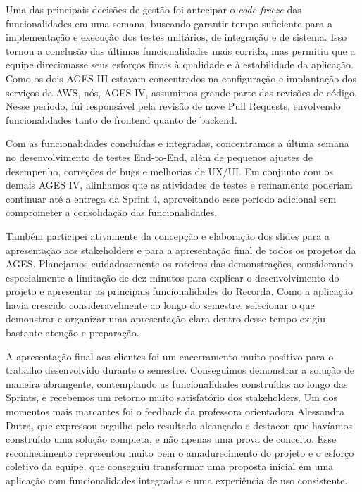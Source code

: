 \indent Uma das principais decisões de gestão foi antecipar o \textit{code freeze} das funcionalidades em uma semana, buscando garantir tempo suficiente para a implementação e execução dos testes unitários, de integração e de sistema. Isso tornou a conclusão das últimas funcionalidades mais corrida, mas permitiu que a equipe direcionasse seus esforços finais à qualidade e à estabilidade da aplicação. Como os dois AGES III estavam concentrados na configuração e implantação dos serviços da AWS, nós, AGES IV, assumimos grande parte das revisões de código. Nesse período, fui responsável pela revisão de nove Pull Requests, envolvendo funcionalidades tanto de frontend quanto de backend.\par

\indent Com as funcionalidades concluídas e integradas, concentramos a última semana no desenvolvimento de testes End-to-End, além de pequenos ajustes de desempenho, correções de bugs e melhorias de UX/UI. Em conjunto com os demais AGES IV, alinhamos que as atividades de testes e refinamento poderiam continuar até a entrega da Sprint 4, aproveitando esse período adicional sem comprometer a consolidação das funcionalidades.\par

\indent Também participei ativamente da concepção e elaboração dos slides para a apresentação aos stakeholders e para a apresentação final de todos os projetos da AGES. Planejamos cuidadosamente os roteiros das demonstrações, considerando especialmente a limitação de dez minutos para explicar o desenvolvimento do projeto e apresentar as principais funcionalidades do Recorda. Como a aplicação havia crescido consideravelmente ao longo do semestre, selecionar o que demonstrar e organizar uma apresentação clara dentro desse tempo exigiu bastante atenção e preparação.\par

\indent A apresentação final aos clientes foi um encerramento muito positivo para o trabalho desenvolvido durante o semestre. Conseguimos demonstrar a solução de maneira abrangente, contemplando as funcionalidades construídas ao longo das Sprints, e recebemos um retorno muito satisfatório dos stakeholders. Um dos momentos mais marcantes foi o feedback da professora orientadora Alessandra Dutra, que expressou orgulho pelo resultado alcançado e destacou que havíamos construído uma solução completa, e não apenas uma prova de conceito. Esse reconhecimento representou muito bem o amadurecimento do projeto e o esforço coletivo da equipe, que conseguiu transformar uma proposta inicial em uma aplicação com funcionalidades integradas e uma experiência de uso consistente.\par

